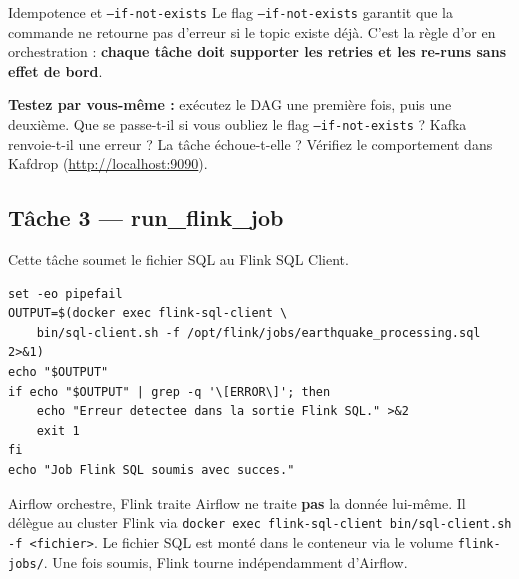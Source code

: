 \documentclass[12pt,a4paper]{article}
\begin{document}
\begin{conceptbox}{Idempotence et \texttt{--if-not-exists}}
  Le flag \texttt{--if-not-exists} garantit que la commande ne retourne pas d'erreur
  si le topic existe déjà. C'est la règle d'or en orchestration :
  \textbf{chaque tâche doit supporter les retries et les re-runs sans effet de bord}.
\end{conceptbox}

\begin{warningbox}
  \textbf{Testez par vous-même :} exécutez le DAG une première fois, puis une deuxième.
  Que se passe-t-il si vous oubliez le flag \texttt{--if-not-exists} ?
  Kafka renvoie-t-il une erreur ? La tâche échoue-t-elle ?
  Vérifiez le comportement dans Kafdrop (\url{http://localhost:9090}).
\end{warningbox}

\subsection{Tâche 3 --- run\_flink\_job}

Cette tâche soumet le fichier SQL au Flink SQL Client.

\begin{lstlisting}[style=bash, caption={Soumission du fichier SQL à Flink}]
set -eo pipefail
OUTPUT=$(docker exec flink-sql-client \
    bin/sql-client.sh -f /opt/flink/jobs/earthquake_processing.sql 2>&1)
echo "$OUTPUT"
if echo "$OUTPUT" | grep -q '\[ERROR\]'; then
    echo "Erreur detectee dans la sortie Flink SQL." >&2
    exit 1
fi
echo "Job Flink SQL soumis avec succes."
\end{lstlisting}

\begin{infobox}{Airflow orchestre, Flink traite}
  Airflow ne traite \textbf{pas} la donnée lui-même. Il délègue au cluster Flink
  via \texttt{docker exec flink-sql-client bin/sql-client.sh -f <fichier>}.
  Le fichier SQL est monté dans le conteneur via le volume \texttt{flink-jobs/}.
  Une fois soumis, Flink tourne indépendamment d'Airflow.
\end{infobox}
\end{document}
